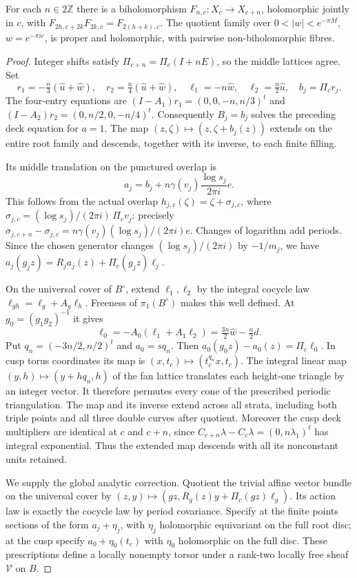 \begin{proposition}\label{fam:src:A.3.1}\label{fam:st:A.3.1}
For each $n\in2\mathbb Z$ there is a biholomorphism $F_{n,c}:X_c\to X_{c+n}$, holomorphic jointly in $c$, with $F_{2h,c+2k}F_{2k,c}=F_{2(h+k),c}$. The quotient family over $0<|w|<e^{-\pi M}$, $w=e^{-\pi ic}$, is proper and holomorphic, with pairwise non-biholomorphic fibres.
\end{proposition}
\begin{proof}
Integer shifts satisfy $\Pi_{c+n}=\Pi_c(I+nE)$, so the middle lattices agree. Set
\[
 r_1=-\tfrac n3(\widehat u+\widehat w),\quad
 r_2=\tfrac n4(\widehat u+\widehat w),\quad
 \ell_1=-n\widehat w,\quad \ell_2=\tfrac n2\widehat u,\quad b_j=\Pi_cr_j.
\]
The four-entry equations are $(I-A_1)r_1=(0,0,-n,n/3)^t$ and $(I-A_2)r_2=(0,n/2,0,-n/4)^t$. Consequently $B_j=b_j$ solves the preceding deck equation for $a=1$. The map $(z,\zeta)\mapsto(z,\zeta+b_j(z))$ extends on the entire root family and descends, together with its inverse, to each finite filling.

Its middle translation on the punctured overlap is
\[
 a_j=b_j+n\gamma(v_j)\frac{\log s_j}{2\pi i}e.
\]
This follows from the actual overlap $h_{j,c}(\zeta)=\zeta+\sigma_{j,c}$, where $\sigma_{j,c}=(\log s_j)/(2\pi i)\,\Pi_cv_j$: precisely $\sigma_{j,c+n}-\sigma_{j,c}=n\gamma(v_j)(\log s_j)/(2\pi i)e$. Changes of logarithm add periods. Since the chosen generator changes $(\log s_j)/(2\pi i)$ by $-1/m_j$, we have $a_j(g_jz)=R_ja_j(z)+\Pi_c(g_jz)\ell_j$.

On the universal cover of $B^\circ$, extend $\ell_1,\ell_2$ by the integral cocycle law $\ell_{gh}=\ell_g+A_g\ell_h$. Freeness of $\pi_1(B^\circ)$ makes this well defined. At $g_0=(g_1g_2)^{-1}$ it gives
\[
 \ell_0=-A_0(\ell_1+A_1\ell_2)=\tfrac{3n}2\widehat w-\tfrac n2d.
\]
Put $q_n=(-3n/2,n/2)^t$ and $a_0=sq_n$. Then $a_0(g_0z)-a_0(z)=\Pi_c\ell_0$. In cusp torus coordinates its map is $(x,t_c)\mapsto(t_c^{q_n}x,t_c)$. The integral linear map $(y,h)\mapsto(y+hq_n,h)$ of the fan lattice translates each height-one triangle by an integer vector. It therefore permutes every cone of the prescribed periodic triangulation. The map and its inverse extend across all strata, including both triple points and all three double curves after quotient. Moreover the cusp deck multipliers are identical at $c$ and $c+n$, since $C_{c+n}\lambda-C_c\lambda=(0,n\lambda_1)^t$ has integral exponential. Thus the extended map descends with all its nonconstant units retained.

We supply the global analytic correction. Quotient the trivial affine vector bundle on the universal cover by
$(z,y)\mapsto(gz,R_g(z)y+\Pi_c(gz)\ell_g)$. Its action law is exactly the cocycle law by period covariance. Specify at the finite points sections of the form $a_j+\eta_j$, with $\eta_j$ holomorphic equivariant on the full root disc; at the cusp specify $a_0+\eta_0(t_c)$ with $\eta_0$ holomorphic on the full disc. These prescriptions define a locally nonempty torsor under a rank-two locally free sheaf $\mathcal V$ on $B$.


\end{proof}
